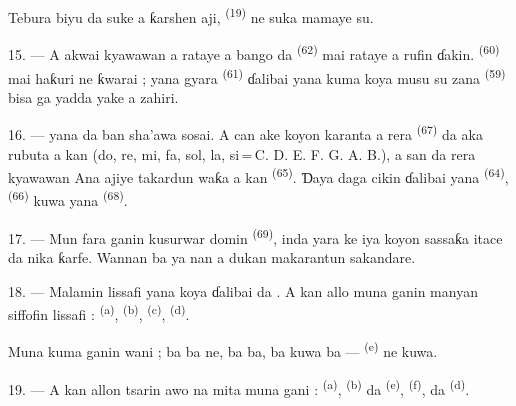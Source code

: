 Tebura biyu da suke a ƙarshen aji, 
\textsuperscript{(19)} ne suka mamaye su.

\VUsaut{4.6mm}
\VUsaut{3.4mm}

15. --- A  akwai kyawawan  a
rataye a bango da  \textsuperscript{(62)} mai
 rataye a rufin ɗakin. 
\textsuperscript{(60)} mai haƙuri ne ƙwarai ; yana gyara
 \textsuperscript{(61)} ɗalibai yana kuma koya musu
su zana  \textsuperscript{(59)} bisa ga yadda
yake a zahiri.

16. ---  yana da ban sha’awa sosai. A can ake koyon
karanta  a rera 
\textsuperscript{(67)} da aka rubuta a kan  (do,
re, mi, fa, sol, la, si\,=\,C. D. E. F. G. A. B.), a san
 da rera kyawawan  Ana ajiye
takardun waƙa a kan  \textsuperscript{(65)}.
Ɗaya daga cikin ɗalibai yana 
\textsuperscript{(64)},  \textsuperscript{(66)}
kuwa yana  \textsuperscript{(68)}.

17. --- Mun fara ganin kusurwar  domin
 \textsuperscript{(69)}, inda yara ke iya koyon
sassaƙa itace da nika ƙarfe. Wannan ba ya nan a dukan makarantun
sakandare.

\VUsaut{5.0mm}
\VUsaut{3.6mm}

18. --- Malamin lissafi yana koya  ɗalibai  da . A
kan allo muna ganin manyan siffofin lissafi : 
\textsuperscript{(a)},  \textsuperscript{(b)},
 \textsuperscript{(c)}, 
\textsuperscript{(d)}.

Muna kuma ganin wani  ; ba  ba
ne, ba  ba, ba kuwa  ba — 
\textsuperscript{(e)} ne kuwa.

19. --- A kan allon tsarin awo na mita muna gani : 
\textsuperscript{(a)},  \textsuperscript{(b)} da
  \textsuperscript{(e)},
 \textsuperscript{(f)},  da
 \textsuperscript{(d)}.

